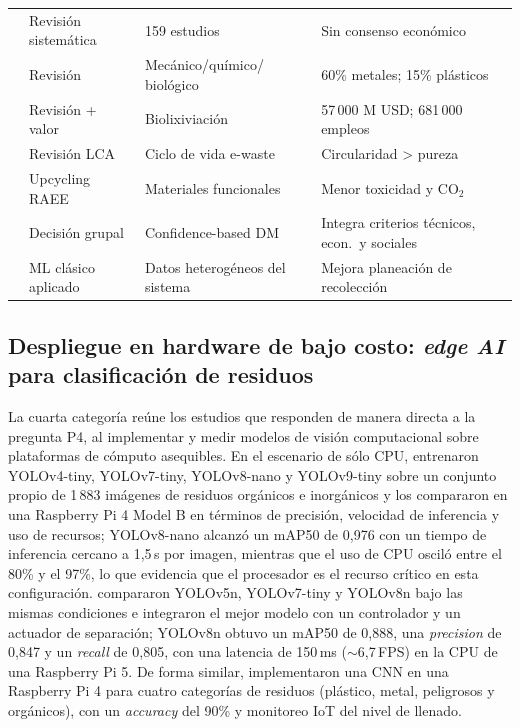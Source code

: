 \begin{table}[H]
{\begin{tabular}{p{3.4cm}p{3.5cm}p{3.5cm}p{5cm}}
\cite{leeEnvironmentalEconomicImpacts2024b} & Revisión sistemática & 159 estudios & Sin consenso económico \\
\cite{elgarahyRevitalizingCircularEconomy2024} & Revisión & Mecánico/químico/ biológico & 60\% metales; 15\% plásticos \\
\cite{dixitBiologicalApproachesEwaste2023} & Revisión + valor & Biolixiviación & 57\,000 M USD; 681\,000 empleos \\
\cite{heDrivingSustainableCircular2024} & Revisión LCA & Ciclo de vida e-waste & Circularidad > pureza \\
\cite{dagwar_upcycling_2026} & Upcycling RAEE & Materiales funcionales & Menor toxicidad y CO\(_2\) \\
\cite{seikhIdentifyingSustainableStrategies2024} & Decisión grupal & Confidence-based DM & Integra criterios técnicos, econ.\ y sociales \\
\cite{varshaDataDrivenEWasteManagement2025a} & ML clásico aplicado & Datos heterogéneos del sistema & Mejora planeación de recolección \\
\hline
\end{tabular}}
\end{table}

\subsection{Despliegue en hardware de bajo costo: \textit{edge AI} para clasificación de residuos}
La cuarta categoría reúne los estudios que responden de manera directa a la pregunta P4, al implementar y medir modelos de visión computacional sobre plataformas de cómputo asequibles. En el escenario de sólo CPU, \cite{castrobelloConvolutionalNeuralNetwork2025} entrenaron YOLOv4-tiny, YOLOv7-tiny, YOLOv8-nano y YOLOv9-tiny sobre un conjunto propio de 1\,883 imágenes de residuos orgánicos e inorgánicos y los compararon en una Raspberry Pi 4 Model B en términos de precisión, velocidad de inferencia y uso de recursos; YOLOv8-nano alcanzó un mAP50 de 0{,}976 con un tiempo de inferencia cercano a 1{,}5\,s por imagen, mientras que el uso de CPU osciló entre el 80\% y el 97\%, lo que evidencia que el procesador es el recurso crítico en esta configuración. \cite{daoDesignImplementationRealTime2026} compararon YOLOv5n, YOLOv7-tiny y YOLOv8n bajo las mismas condiciones e integraron el mejor modelo con un controlador y un actuador de separación; YOLOv8n obtuvo un mAP50 de 0{,}888, una \textit{precision} de 0{,}847 y un \textit{recall} de 0{,}805, con una latencia de 150\,ms ($\sim$6{,}7\,FPS) en la CPU de una Raspberry Pi 5. De forma similar, \cite{yulizaRaspberryPi4Ultrasonic2024} implementaron una CNN en una Raspberry Pi 4 para cuatro categorías de residuos (plástico, metal, peligrosos y orgánicos), con un \textit{accuracy} del 90\% y monitoreo IoT del nivel de llenado.\\

